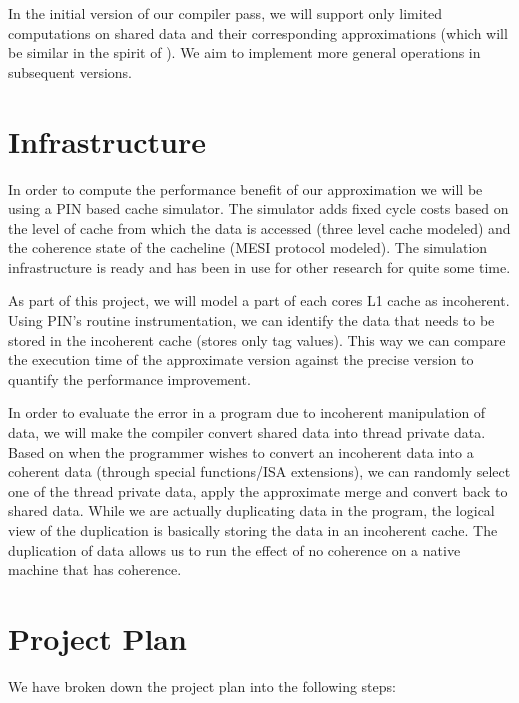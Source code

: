 \documentclass[12pt,conference]{IEEEtran}
\begin{document}
In the initial version of our compiler pass, we will 
support only limited computations on shared data and their
corresponding approximations (which will be similar in the 
spirit of \cite{paraprox}). We aim to implement more
general operations in subsequent versions.

\section{Infrastructure}

In order to compute the performance benefit of our approximation
we will be using a PIN based cache simulator. The simulator adds 
fixed cycle costs based on the level of cache from which the
data is accessed (three level cache modeled) and the coherence
state of the cacheline (MESI protocol modeled). The simulation
infrastructure is ready and has been in use for other research
for quite some time.

As part of this project, we will model a part of each cores
L1 cache as incoherent. Using PIN's routine instrumentation,
we can identify the data that needs to be stored in the incoherent
cache (stores only tag values). This way we can compare the 
execution time of the approximate version against the precise
version to quantify the performance improvement.

In order to evaluate the error in a program due to incoherent 
manipulation of data, we will make the compiler convert 
shared data into thread private data. Based on when the programmer
wishes to convert an incoherent data into a coherent data (through 
special functions/ISA extensions), we can randomly select one
of the thread private data, apply the approximate merge and convert
back to shared data. While we are actually duplicating data in 
the program, the logical view of the duplication is basically
storing the data in an incoherent cache. The duplication of data
allows us to run the effect of no coherence on a native machine
that has coherence.


\section{Project Plan}

We have broken down the project plan into the following steps:
\end{document}
